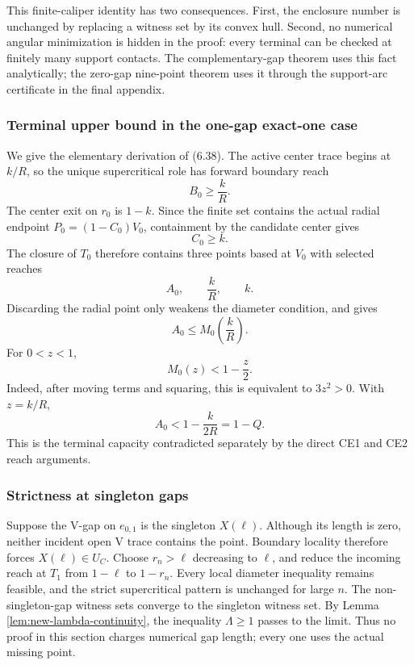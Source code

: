 This finite-caliper identity has two consequences.  First, the enclosure
number is unchanged by replacing a witness set by its convex hull.  Second,
no numerical angular minimization is hidden in the proof: every terminal can
be checked at finitely many support contacts.  The complementary-gap theorem
uses this fact analytically; the zero-gap nine-point theorem uses it through
the support-arc certificate in the final appendix.

\subsubsection{Terminal upper bound in the one-gap exact-one case}

We give the elementary derivation of (6.38).  The active center trace begins
at $k/R$, so the unique supercritical role has forward boundary reach
\[
 B_0\ge\frac{k}{R}.
\]
The center exit on $r_0$ is $1-k$.  Since the finite set contains the actual
radial endpoint $P_0=(1-C_0)V_0$, containment by the candidate center gives
\[
 C_0\ge k.
\]
The closure of $T_0$ therefore contains three points based at $V_0$ with
selected reaches
\[
 A_0,
 \qquad \frac{k}{R},
 \qquad k.
\]
Discarding the radial point only weakens the diameter condition, and gives
\[
 A_0\le M_0\left(\frac{k}{R}\right).
\]
For $0<z<1$,
\[
 M_0(z)<1-\frac z2.
\]
Indeed, after moving terms and squaring, this is equivalent to
$3z^2>0$.  With $z=k/R$,
\[
 A_0<1-\frac{k}{2R}=1-Q.
\]
This is the terminal capacity contradicted separately by the direct CE1 and
CE2 reach arguments.

\subsubsection{Strictness at singleton gaps}

Suppose the V-gap on $e_{0,1}$ is the singleton $X(\ell)$.  Although its
length is zero, neither incident open V trace contains the point.  Boundary
locality therefore forces $X(\ell)\in U_C$.  Choose
$r_n>\ell$ decreasing to $\ell$, and reduce the incoming reach at $T_1$ from
$1-\ell$ to $1-r_n$.  Every local diameter inequality remains feasible, and
the strict supercritical pattern is unchanged for large $n$.  The non-singleton-gap
witness sets converge to the singleton witness set.  By Lemma
\ref{lem:new-lambda-continuity}, the inequality $\Lambda\ge1$ passes to the
limit.  Thus no proof in this section charges numerical gap length; every one
uses the actual missing point.

